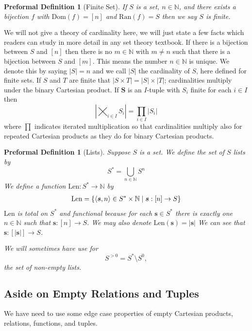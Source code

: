 \documentclass[oneside, 12pt]{book}
\theoremstyle{break}
\newtheorem{preformal definition}[definition]{Preformal Definition}
\newtheorem{preformal theorem}[theorem]{Preformal Theorem}
\newcommand{\bv}[1]{\boldsymbol{#1}}
\newcommand{\N}[0]{\mathbb{N}}
\newcommand{\norm}[1]{\left|#1\right|}
\begin{document}
			\begin{preformal definition}[Finite Set]
				If $S$ is a set, $n\in \N$, and there exists a bijection $f$ with $\text{Dom}(f) = [n]$ and $\text{Ran}(f) = S$ then we say $S$ is finite.				
			\end{preformal definition}
			We will not give a theory of cardinality here, we will just state a few facts which readers can study in more detail in any set theory textbook.
			If there is a bijection between $S$ and $[n]$ then there is no $m\in \N$ with $m\neq n$ such that there is a bijection between $S$ and $[m]$. 
			This means the number $n \in \N$ is unique.
			We denote this by saying $\norm{S} = n$ and we call $\norm{S}$ the cardinality of $S$, here defined for finite sets.
			If $S$ and $T$ are finite that $\norm{S\times T} = \norm{S} \times \norm{T}$; cardinalities multiply under the binary Cartesian product.
			If $\bv{S}$ is an $I$-tuple with $S_i$ finite for each $i\in I$ then
			\begin{equation*}
				\norm{\bigtimes_{i\in I} S_i} = \prod_{i\in I} \norm{S_i} 
			\end{equation*}
			where $\prod$ indicates iterated multiplication so that cardinalities multiply also for repeated Cartesian products as they do for binary Cartesian products.

			\begin{preformal definition}[Lists]
				Suppose $S$ is a set.
				We define the set of $S$ lists by
				\begin{equation*}
					S^* = \bigcup_{n\in \N} S^n
				\end{equation*}
				We define a function $\text{Len}:S^* \to \N$ by
				\begin{align*}
					\text{Len} = \{\braket{\bv{s}, n} \in S^* \times \N \mid \bv{s}: [n] \to S\}
				\end{align*}
				$\text{Len}$ is total on $S^*$ and functional because for each $\bv{s} \in S^*$ there is exactly one $n\in \N$ such that $\bv{s}: [n] \to S$.
				We may also denote $\text{Len}(\bv{s}) = \norm{\bv{s}}$
				We can see that $\bv{s}:[\norm{\bv{s}}] \to S$.
				
				We will sometimes have use for
				\begin{equation*}
					S^{>0} = S^*\setminus S^0,
				\end{equation*}
				the set of non-empty lists.
			\end{preformal definition}
	
			\subsection{Aside on Empty Relations and Tuples}
				We have need to use some edge case properties of empty Cartesian products, relations, functions, and tuples.
				
\end{document}
